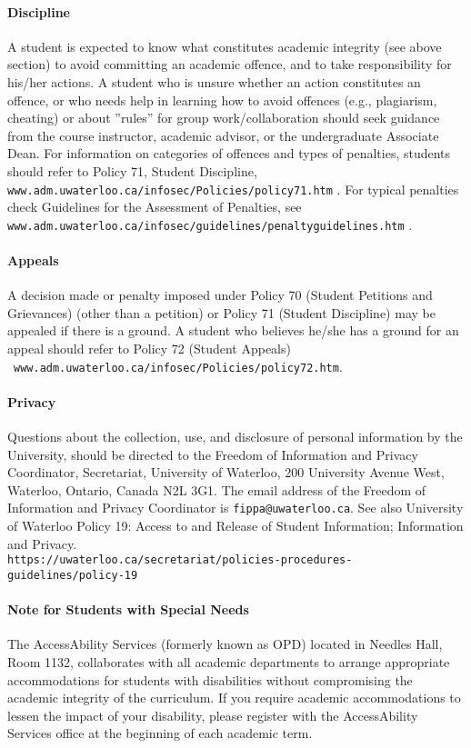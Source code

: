 \documentclass[letterpaper,10pt]{article}
\begin{document}
\paragraph{Discipline}
A student is expected to know what constitutes academic integrity (see above section) to avoid committing an academic offence, and to take responsibility for his/her actions. A student who is unsure whether an action constitutes an offence, or who needs help in learning how to avoid offences (e.g., plagiarism, cheating) or about ''rules'' for group work/collaboration should seek guidance from the course instructor, academic advisor, or the undergraduate Associate Dean. For information on categories of offences and types of penalties, students should refer to Policy 71, Student Discipline, \texttt{www.adm.uwaterloo.ca/infosec/Policies/policy71.htm} . For typical penalties check Guidelines for the Assessment of Penalties, see \\\texttt{www.adm.uwaterloo.ca/infosec/guidelines/penaltyguidelines.htm} .

\paragraph{Appeals}
A decision made or penalty imposed under Policy 70 (Student Petitions and Grievances) (other than a petition) or Policy 71 (Student Discipline) may be appealed if there is a ground. A student who believes he/she has a ground for an appeal should refer to Policy 72 (Student Appeals)\\~\texttt{www.adm.uwaterloo.ca/infosec/Policies/policy72.htm}.

\paragraph{Privacy}
Questions about the collection, use, and disclosure of personal information by the University, should be directed to the Freedom of Information and Privacy Coordinator, Secretariat, University of Waterloo, 200 University Avenue West, Waterloo, Ontario, Canada N2L 3G1. The email address of the Freedom of Information and Privacy Coordinator is \texttt{fippa@uwaterloo.ca}. See also University of Waterloo Policy 19: Access to and Release of Student Information; Information and Privacy.
\\ \texttt{https://uwaterloo.ca/secretariat/policies-procedures-guidelines/policy-19}

\paragraph{Note for Students with Special Needs}
The AccessAbility Services (formerly known as OPD) located in Needles Hall, Room 1132, collaborates with all academic departments to arrange appropriate accommodations for students with disabilities without compromising the academic integrity of the curriculum. If you require academic accommodations to lessen the impact of your disability, please register with the AccessAbility Services office at the beginning of each academic term.
\end{document}
